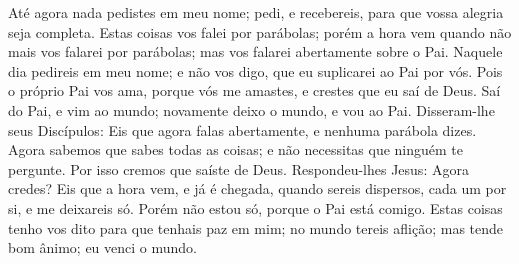 {Até agora nada pedistes em meu nome; pedi, e recebereis, para que vossa alegria seja completa.
Estas coisas vos falei por parábolas; porém a hora vem quando não mais vos falarei por parábolas; mas vos falarei abertamente sobre o Pai.
Naquele dia pedireis em meu nome; e não vos digo, que eu suplicarei ao Pai por vós.
Pois o próprio Pai vos ama, porque vós me amastes, e crestes que eu saí de Deus.
Saí do Pai, e vim ao mundo; novamente deixo o mundo, e vou ao Pai.
Disseram-lhe seus Discípulos: Eis que agora falas abertamente, e nenhuma parábola dizes.
Agora sabemos que sabes todas as coisas; e não necessitas que ninguém te pergunte. Por isso cremos que saíste de Deus.
Respondeu-lhes Jesus: Agora credes?
Eis que a hora vem, e já é chegada, quando sereis dispersos, cada um por si, e me deixareis só. Porém não estou só, porque o Pai está comigo.
Estas coisas tenho vos dito para que tenhais paz em mim; no mundo tereis aflição; mas tende bom ânimo; eu venci o mundo.

}
